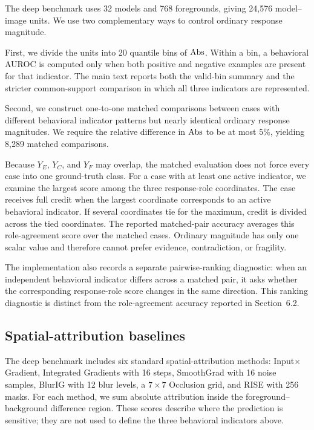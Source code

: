 The deep benchmark uses 32 models and 768 foregrounds, giving 24,576 model--image units. We use two complementary ways to control ordinary response magnitude.

First, we divide the units into 20 quantile bins of $\mathrm{Abs}$. Within a bin, a behavioral AUROC is computed only when both positive and negative examples are present for that indicator. The main text reports both the valid-bin summary and the stricter common-support comparison in which all three indicators are represented.

Second, we construct one-to-one matched comparisons between cases with different behavioral indicator patterns but nearly identical ordinary response magnitudes. We require the relative difference in $\mathrm{Abs}$ to be at most $5\%$, yielding 8,289 matched comparisons.

Because $Y_E$, $Y_C$, and $Y_F$ may overlap, the matched evaluation does not force every case into one ground-truth class. For a case with at least one active indicator, we examine the largest score among the three response-role coordinates. The case receives full credit when the largest coordinate corresponds to an active behavioral indicator. If several coordinates tie for the maximum, credit is divided across the tied coordinates. The reported matched-pair accuracy averages this role-agreement score over the matched cases. Ordinary magnitude has only one scalar value and therefore cannot prefer evidence, contradiction, or fragility.

The implementation also records a separate pairwise-ranking diagnostic: when an independent behavioral indicator differs across a matched pair, it asks whether the corresponding response-role score changes in the same direction. This ranking diagnostic is distinct from the role-agreement accuracy reported in Section~6.2.

\subsection{Spatial-attribution baselines}

The deep benchmark includes six standard spatial-attribution methods: Input$\times$Gradient, Integrated Gradients with 16 steps, SmoothGrad with 16 noise samples, BlurIG with 12 blur levels, a $7\times7$ Occlusion grid, and RISE with 256 masks. For each method, we sum absolute attribution inside the foreground--background difference region. These scores describe where the prediction is sensitive; they are not used to define the three behavioral indicators above.

